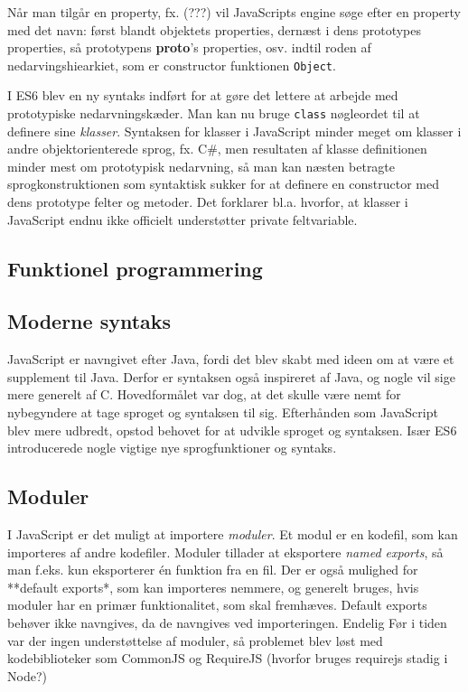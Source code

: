 \documentclass[]{article}
\begin{document}
Når man tilgår en property, fx. (???) vil JavaScripts engine søge efter
en property med det navn: først blandt objektets properties, dernæst i
dens prototypes properties, så prototypens \textbf{proto}'s properties,
osv. indtil roden af nedarvingshiearkiet, som er constructor funktionen
\texttt{Object}.

I ES6 blev en ny syntaks indført for at gøre det lettere at arbejde med
prototypiske nedarvningskæder. Man kan nu bruge \texttt{class}
nøgleordet til at definere sine \emph{klasser}. Syntaksen for klasser i
JavaScript minder meget om klasser i andre objektorienterede sprog, fx.
C\#, men resultaten af klasse definitionen minder mest om prototypisk
nedarvning, så man kan næsten betragte sprogkonstruktionen som
syntaktisk sukker for at definere en constructor med dens prototype
felter og metoder. Det forklarer bl.a. hvorfor, at klasser i JavaScript
endnu ikke officielt understøtter private feltvariable.

\hypertarget{funktionel-programmering}{%
\subsection{Funktionel programmering}\label{funktionel-programmering}}

\hypertarget{moderne-syntaks}{%
\subsection{Moderne syntaks}\label{moderne-syntaks}}

JavaScript er navngivet efter Java, fordi det blev skabt med ideen om at
være et supplement til Java. Derfor er syntaksen også inspireret af
Java, og nogle vil sige mere generelt af C. Hovedformålet var dog, at
det skulle være nemt for nybegyndere at tage sproget og syntaksen til
sig. Efterhånden som JavaScript blev mere udbredt, opstod behovet for at
udvikle sproget og syntaksen. Især ES6 introducerede nogle vigtige nye
sprogfunktioner og syntaks.

\hypertarget{moduler}{%
\subsection{Moduler}\label{moduler}}

I JavaScript er det muligt at importere \emph{moduler}. Et modul er en
kodefil, som kan importeres af andre kodefiler. Moduler tillader at
eksportere \emph{named exports}, så man f.eks. kun eksporterer én
funktion fra en fil. Der er også mulighed for **default exports*, som
kan importeres nemmere, og generelt bruges, hvis moduler har en primær
funktionalitet, som skal fremhæves. Default exports behøver ikke
navngives, da de navngives ved importeringen. Endelig Før i tiden var
der ingen understøttelse af moduler, så problemet blev løst med
kodebiblioteker som CommonJS og RequireJS (hvorfor bruges requirejs
stadig i Node?)
\end{document}
